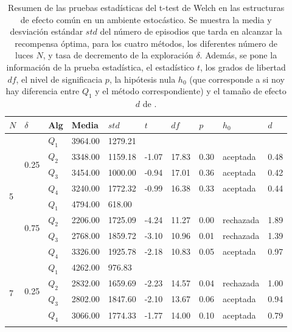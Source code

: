 \begin{table}[]
\centering
\caption{Resumen de las pruebas estadísticas del t-test de Welch en las
estructuras de efecto común en un ambiente estocástico. Se muestra la media y desviación estándar $std$ del número 
de episodios que tarda en alcanzar la recompensa óptima, para los cuatro métodos, los diferentes número de luces $N$, y tasa de decremento de la exploración $\delta$. Además, se pone la información
de la prueba estadística, el estadístico $t$, los grados de libertad $df$, el nivel
de significacia $p$, la hipótesis nula $h_0$ (que corresponde a si noy hay diferencia entre $Q_1$ y el método correspondiente) y el tamaño de efecto $d$ de \citet{cohen2013statistical}.}
\label{tab:common-effect-one-to-one-delta-sto}
\begin{tabular}{|l|l|l|l|l|l|l|l|l|l|}
\hline
$N$ & $\delta$ & Alg & Media & $std$ & $t$ & $df$ & $p$ & $h_0$ & $d$ \\ \hline
\multirow{8}{*}{5} & \multirow{4}{*}{0.25} & $Q_1$ & 3964.00 & 1279.21 & \multicolumn{5}{l|}{} \\ \cline{3-10} 
 &  & $Q_2$ & 3348.00 & 1159.18 & -1.07 & 17.83 & 0.30 & aceptada & 0.48 \\ \cline{3-10} 
 &  & $Q_3$ & 3454.00 & 1000.00 & -0.94 & 17.01 & 0.36 & aceptada & 0.42 \\ \cline{3-10} 
 &  & $Q_4$ & 3240.00 & 1772.32 & -0.99 & 16.38 & 0.33 & aceptada & 0.44 \\ \cline{2-10} 
 & \multirow{4}{*}{0.75} & $Q_1$ & 4794.00 & 618.00 & \multicolumn{5}{l|}{} \\ \cline{3-10} 
 &  & $Q_2$ & 2206.00 & 1725.09 & -4.24 & 11.27 & 0.00 & rechazada & 1.89 \\ \cline{3-10} 
 &  & $Q_3$ & 2768.00 & 1859.72 & -3.10 & 10.96 & 0.01 & rechazada & 1.39 \\ \cline{3-10} 
 &  & $Q_4$ & 3326.00 & 1925.78 & -2.18 & 10.83 & 0.05 & aceptada & 0.97 \\ \hline
\multirow{8}{*}{7} & \multirow{4}{*}{0.25} & $Q_1$ & 4262.00 & 976.83 & \multicolumn{5}{l|}{} \\ \cline{3-10} 
 &  & $Q_2$ & 2832.00 & 1659.69 & -2.23 & 14.57 & 0.04 & rechazada & 1.00 \\ \cline{3-10} 
 &  & $Q_3$ & 2802.00 & 1847.60 & -2.10 & 13.67 & 0.06 & aceptada & 0.94 \\ \cline{3-10} 
 &  & $Q_4$ & 3066.00 & 1774.33 & -1.77 & 14.00 & 0.10 & aceptada & 0.79 \\ \cline{2-10} 

\end{tabular}
\end{table}
